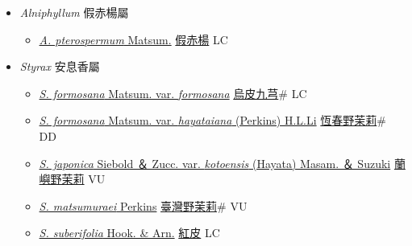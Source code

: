 
  \begin{itemize}
 \item[] \textit{Alniphyllum} 假赤楊屬
                    
  \begin{itemize}
        \item[] \href{http://www.theplantlist.org/tpl1.1/search?q=Alniphyllum+pterospermum}{\textit{A. pterospermum} Matsum.}   \href{\detokenize{http://taibnet.sinica.edu.tw/chi/taibnet_species_list.php?T2=假赤楊&T2_new_value=true&fr=y}}{假赤楊} LC
  \end{itemize}
 \item[] \textit{Styrax} 安息香屬
                    
  \begin{itemize}
        \item[] \href{http://www.theplantlist.org/tpl1.1/search?q=Styrax+formosana+var.+formosana}{\textit{S. formosana} Matsum. var. \textit{formosana}}   \href{\detokenize{http://taibnet.sinica.edu.tw/chi/taibnet_species_list.php?T2=烏皮九芎&T2_new_value=true&fr=y}}{烏皮九芎}\# LC
        \item[] \href{http://www.theplantlist.org/tpl1.1/search?q=Styrax+formosana+var.+hayataiana}{\textit{S. formosana} Matsum. var. \textit{hayataiana} (Perkins) H.L.Li}   \href{\detokenize{http://taibnet.sinica.edu.tw/chi/taibnet_species_list.php?T2=恆春野茉莉&T2_new_value=true&fr=y}}{恆春野茉莉}\# DD
        \item[] \href{http://www.theplantlist.org/tpl1.1/search?q=Styrax+japonica+var.+kotoensis}{\textit{S. japonica} Siebold ＆ Zucc. var. \textit{kotoensis} (Hayata) Masam. ＆ Suzuki}   \href{\detokenize{http://taibnet.sinica.edu.tw/chi/taibnet_species_list.php?T2=蘭嶼野茉莉&T2_new_value=true&fr=y}}{蘭嶼野茉莉} VU
        \item[] \href{http://www.theplantlist.org/tpl1.1/search?q=Styrax+matsumuraei}{\textit{S. matsumuraei} Perkins}   \href{\detokenize{http://taibnet.sinica.edu.tw/chi/taibnet_species_list.php?T2=臺灣野茉莉&T2_new_value=true&fr=y}}{臺灣野茉莉}\# VU
        \item[] \href{http://www.theplantlist.org/tpl1.1/search?q=Styrax+suberifolia}{\textit{S. suberifolia} Hook. \& Arn.}   \href{\detokenize{http://taibnet.sinica.edu.tw/chi/taibnet_species_list.php?T2=紅皮&T2_new_value=true&fr=y}}{紅皮} LC
  \end{itemize}
  \end{itemize}
